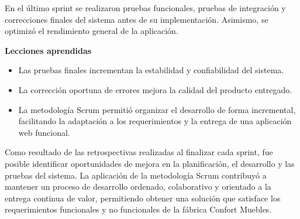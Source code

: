 En el último sprint se realizaron pruebas funcionales, pruebas de integración y correcciones finales del sistema antes de su implementación. Asimismo, se optimizó el rendimiento general de la aplicación.

\textbf{Lecciones aprendidas}

\begin{itemize}
    \item Las pruebas finales incrementan la estabilidad y confiabilidad del sistema.
    \item La corrección oportuna de errores mejora la calidad del producto entregado.
    \item La metodología Scrum permitió organizar el desarrollo de forma incremental, facilitando la adaptación a los requerimientos y la entrega de una aplicación web funcional.
\end{itemize}

Como resultado de las retrospectivas realizadas al finalizar cada sprint, fue posible identificar oportunidades de mejora en la planificación, el desarrollo y las pruebas del sistema. La aplicación de la metodología Scrum contribuyó a mantener un proceso de desarrollo ordenado, colaborativo y orientado a la entrega continua de valor, permitiendo obtener una solución que satisface los requerimientos funcionales y no funcionales de la fábrica Confort Muebles.